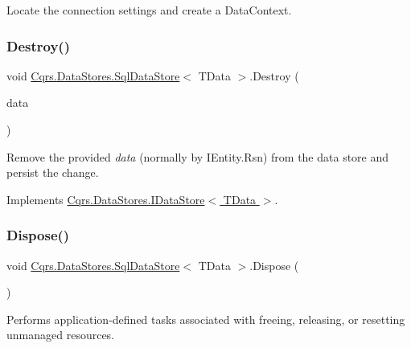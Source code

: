 Locate the connection settings and create a Data\+Context. 

\mbox{\label{classCqrs_1_1DataStores_1_1SqlDataStore_a5ec396c9eb202c8de931c1546c721ca3}} 
\subsubsection{\texorpdfstring{Destroy()}{Destroy()}}
{\footnotesize\ttfamily void \hyperlink{classCqrs_1_1DataStores_1_1SqlDataStore}{Cqrs.\+Data\+Stores.\+Sql\+Data\+Store}$<$ T\+Data $>$.Destroy (\begin{DoxyParamCaption}\item[{T\+Data}]{data }\end{DoxyParamCaption})}



Remove the provided {\itshape data}  (normally by I\+Entity.\+Rsn) from the data store and persist the change. 



Implements \hyperlink{interfaceCqrs_1_1DataStores_1_1IDataStore_aa7ade96f2f3151d5353cf7bdbb2baec5}{Cqrs.\+Data\+Stores.\+I\+Data\+Store$<$ T\+Data $>$}.

\mbox{\label{classCqrs_1_1DataStores_1_1SqlDataStore_a975c0087677987dffccc4f0ffa97e691}} 
\subsubsection{\texorpdfstring{Dispose()}{Dispose()}}
{\footnotesize\ttfamily void \hyperlink{classCqrs_1_1DataStores_1_1SqlDataStore}{Cqrs.\+Data\+Stores.\+Sql\+Data\+Store}$<$ T\+Data $>$.Dispose (\begin{DoxyParamCaption}{ }\end{DoxyParamCaption})}



Performs application-\/defined tasks associated with freeing, releasing, or resetting unmanaged resources. 

